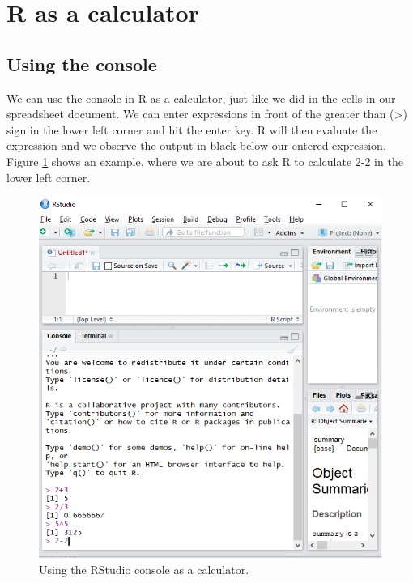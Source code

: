 \documentclass[]{book}
\begin{document}
\hypertarget{r-as-a-calculator}{%
\section{R as a calculator}\label{r-as-a-calculator}}

\hypertarget{using-the-console}{%
\subsection*{Using the console}\label{using-the-console}}

We can use the console in R as a calculator, just like we did in the cells in our spreadsheet document. We can enter expressions in front of the greater than (\textgreater{}) sign in the lower left corner and hit the enter key. R will then evaluate the expression and we observe the output in black below our entered expression. Figure \ref{fig:rguide3} shows an example, where we are about to ask R to calculate 2-2 in the lower left corner.

\begin{figure}

{\centering \includegraphics[width=0.9\linewidth]{_resources/chapter_Rbasic/r1} 

}

\caption{Using the RStudio console as a calculator. }\label{fig:rguide3}
\end{figure}
\end{document}
